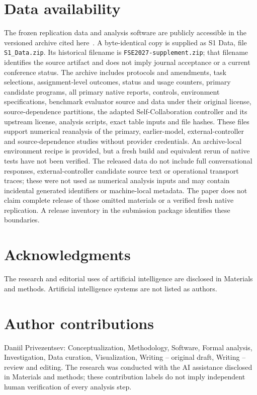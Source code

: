 \documentclass[10pt,letterpaper]{article}
\begin{document}
\section*{Data availability}
The frozen replication data and analysis software are publicly accessible in the versioned archive cited here~\cite{privezentsev2026data}. A byte-identical copy is supplied as S1 Data, file \texttt{S1\_Data.zip}. Its historical filename is \texttt{FSE2027-supplement.zip}; that filename identifies the source artifact and does not imply journal acceptance or a current conference status. The archive includes protocols and amendments, task selections, assignment-level outcomes, status and usage counters, primary candidate programs, all primary native reports, controls, environment specifications, benchmark evaluator source and data under their original license, source-dependence partitions, the adapted Self-Collaboration controller and its upstream license, analysis scripts, exact table inputs and file hashes. These files support numerical reanalysis of the primary, earlier-model, external-controller and source-dependence studies without provider credentials. An archive-local environment recipe is provided, but a fresh build and equivalent rerun of native tests have not been verified. The released data do not include full conversational responses, external-controller candidate source text or operational transport traces; these were not used as numerical analysis inputs and may contain incidental generated identifiers or machine-local metadata. The paper does not claim complete release of those omitted materials or a verified fresh native replication. A release inventory in the submission package identifies these boundaries.
\section*{Acknowledgments}
The research and editorial uses of artificial intelligence are disclosed in Materials and methods. Artificial intelligence systems are not listed as authors.
\section*{Author contributions}
Daniil Privezentsev: Conceptualization, Methodology, Software, Formal analysis, Investigation, Data curation, Visualization, Writing -- original draft, Writing -- review and editing. The research was conducted with the AI assistance disclosed in Materials and methods; these contribution labels do not imply independent human verification of every analysis step.

\end{document}
